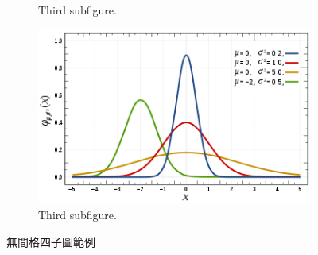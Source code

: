\begin{figure}[!htb]
\begin{subfigure}{0.4\textwidth}
        \caption{Third subfigure.}
        \label{fig:third_nospace}
    \end{subfigure}
    \begin{subfigure}{0.4\textwidth}
        \includegraphics[width=\textwidth]{figures/gambar.png}
        \caption{Third subfigure.}
        \label{fig:fourth_nospace}
    \end{subfigure}
    \caption{無間格四子圖範例}
    \label{fig:four_nospace}
\end{figure}


